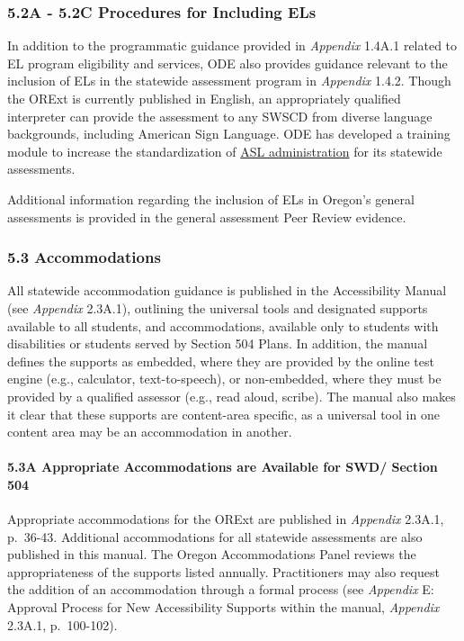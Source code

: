 \documentclass[]{article}
\let\oldparagraph\paragraph
\renewcommand{\paragraph}[1]{\oldparagraph{#1}\mbox{}}
\begin{document}
\subsubsection{5.2A - 5.2C Procedures for Including
ELs}\label{a---5.2c-procedures-for-including-els}

In addition to the programmatic guidance provided in \emph{Appendix}
1.4A.1 related to EL program eligibility and services, ODE also provides
guidance relevant to the inclusion of ELs in the statewide assessment
program in \emph{Appendix} 1.4.2. Though the ORExt is currently
published in English, an appropriately qualified interpreter can provide
the assessment to any SWSCD from diverse language backgrounds, including
American Sign Language. ODE has developed a training module to increase
the standardization of \color{link}\href{http://lms.brtprojects.org}{ASL
administration} \color{black} for its statewide assessments.

Additional information regarding the inclusion of ELs in Oregon's
general assessments is provided in the general assessment Peer Review
evidence.

\subsubsection{5.3 Accommodations}\label{accommodations}

All statewide accommodation guidance is published in the Accessibility
Manual (see \emph{Appendix} 2.3A.1), outlining the universal tools and
designated supports available to all students, and accommodations,
available only to students with disabilities or students served by
Section 504 Plans. In addition, the manual defines the supports as
embedded, where they are provided by the online test engine (e.g.,
calculator, text-to-speech), or non-embedded, where they must be
provided by a qualified assessor (e.g., read aloud, scribe). The manual
also makes it clear that these supports are content-area specific, as a
universal tool in one content area may be an accommodation in another.

\paragraph{5.3A Appropriate Accommodations are Available for SWD/
Section
504}\label{a-appropriate-accommodations-are-available-for-swd-section-504}

Appropriate accommodations for the ORExt are published in
\emph{Appendix} 2.3A.1, p.~36-43. Additional accommodations for all
statewide assessments are also published in this manual. The Oregon
Accommodations Panel reviews the appropriateness of the supports listed
annually. Practitioners may also request the addition of an
accommodation through a formal process (see \emph{Appendix} E: Approval
Process for New Accessibility Supports within the manual,
\emph{Appendix} 2.3A.1, p.~100-102).
\end{document}
